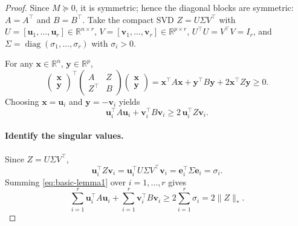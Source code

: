 \documentclass[11pt]{article}
\theoremstyle{spaced}
\begin{document}
\begin{proof}
Since \(M \succeq 0\), it is symmetric; hence the diagonal blocks are symmetric:
\(A = A^\top\) and \(B = B^\top\).
Take the compact SVD \(Z = U\Sigma V^\top\) with
\(U = [\mathbf{u}_1,\ldots,\mathbf{u}_r] \in \mathbb{R}^{n \times r}\),
\(V = [\mathbf{v}_1,\ldots,\mathbf{v}_r] \in \mathbb{R}^{p \times r}\),
\(U^\top U = V^\top V = I_r\),
and \(\Sigma = \operatorname{diag}(\sigma_1,\ldots,\sigma_r)\) with \(\sigma_i > 0\).

For any \(\mathbf{x} \in \mathbb{R}^n\), \(\mathbf{y} \in \mathbb{R}^p\),
\[
\begin{pmatrix}\mathbf{x}\\\mathbf{y}\end{pmatrix}^\top
\begin{pmatrix}A & Z\\ Z^\top & B\end{pmatrix}
\begin{pmatrix}\mathbf{x}\\\mathbf{y}\end{pmatrix}
= \mathbf{x}^\top A \mathbf{x} + \mathbf{y}^\top B \mathbf{y} + 2\mathbf{x}^\top Z \mathbf{y} \ge 0.
\]
Choosing \(\mathbf{x} = \mathbf{u}_i\) and \(\mathbf{y} = -\mathbf{v}_i\) yields
\begin{equation}\label{eq:basic-lemma1}
\mathbf{u}_i^\top A \mathbf{u}_i + \mathbf{v}_i^\top B \mathbf{v}_i \ge 2\,\mathbf{u}_i^\top Z \mathbf{v}_i.
\end{equation}

\paragraph{Identify the singular values.}
Since \(Z = U\Sigma V^\top\),
\[
\mathbf{u}_i^\top Z \mathbf{v}_i
= \mathbf{u}_i^\top U\Sigma V^\top \mathbf{v}_i
= \mathbf{e}_i^\top \Sigma \mathbf{e}_i
= \sigma_i.
\]
Summing \eqref{eq:basic-lemma1} over \(i = 1,\ldots,r\) gives
\begin{equation}\label{eq:summed-lemma1}
\sum_{i=1}^r \mathbf{u}_i^\top A \mathbf{u}_i + \sum_{i=1}^r \mathbf{v}_i^\top B \mathbf{v}_i
\ge 2\sum_{i=1}^r \sigma_i = 2\|Z\|_*.
\end{equation}


\end{proof}
\end{document}
